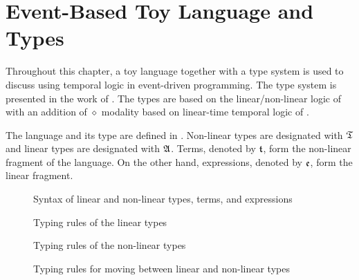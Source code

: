 \section{Event-Based Toy Language and Types}

Throughout this chapter, a toy language together with a type system is used to discuss using temporal logic in event-driven programming. The type system is presented in the work of \cite{Paykin2016TheEO}. The types are based on the linear/non-linear logic of \cite{DBLP:conf/csl/Benton94} with an addition of $\diamond$ modality based on linear-time temporal logic of \cite{DBLP:conf/focs/Pnueli77}.

The language and its type are defined in . Non-linear types are designated with $\mathfrak{T}$ and linear types are designated with $\mathfrak{A}$. Terms, denoted by $\mathfrak{t}$, form the non-linear fragment of the language. On the other hand, expressions, denoted by $\mathfrak{e}$, form the linear fragment.

\begin{figure}
    \centering
    
    \caption{Syntax of linear and non-linear types, terms, and expressions}
    \label{fig:syntax-of-types-terms-expressions}
\end{figure}

\begin{figure}
    \centering
    
    \caption{Typing rules of the linear types}
    \label{fig:typing-rules-for-nonlinear-types}
\end{figure}

\begin{figure}
    \centering
    
    \caption{Typing rules of the non-linear types}
    \label{fig:typing-rules-for-linear-types}
\end{figure}

\begin{figure}
    \centering
    
    \caption{Typing rules for moving between linear and non-linear types}
    \label{fig:typing-rules-for-linear-and-nonlinear-types}
\end{figure}

